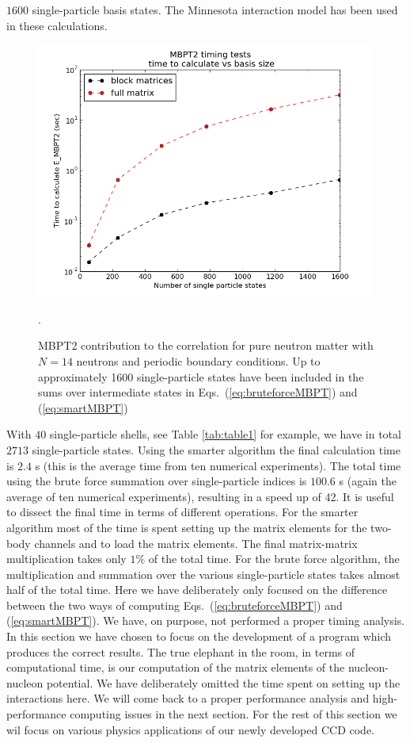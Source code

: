 $1600$ single-particle basis states. The Minnesota interaction model \cite{minnesota} has been used in these calculations.  
\begin{figure}
    \includegraphics[width=\linewidth]{Chapter8-figures/blockvsfull_log.png}
    \caption{MBPT2 contribution to the correlation for pure neutron matter with $N=14$ neutrons and periodic boundary conditions. Up to approximately 1600 single-particle states have been included in the sums over intermediate states in Eqs.~(\ref{eq:bruteforceMBPT}) and (\ref{eq:smartMBPT})}. 
    \label{fig:speedup1}
  \end{figure}
With $40$ single-particle shells, see Table \ref{tab:table1} for
example, we have in total $2713$ single-particle states.  Using the
smarter algorithm the final calculation time is $2.4$ s (this is the
average time from ten numerical experiments).  The total time using
the brute force summation over single-particle indices is $100.6$ s
(again the average of ten numerical experiments), resulting in a speed
up of 42. It is useful to dissect the final time in terms of different
operations.  For the smarter algorithm most of the time is spent
setting up the matrix elements for the two-body channels and to load
the matrix elements. The final matrix-matrix multiplication takes only
$1\%$ of the total time. For the brute force algorithm, the
multiplication and summation over the various single-particle states
takes almost half of the total time. Here we have deliberately only
focused on the difference between the two ways of computing
Eqs.~(\ref{eq:bruteforceMBPT}) and (\ref{eq:smartMBPT}). We have, on
purpose, not performed a proper timing analysis. In this section we
have chosen to focus on the development of a program which produces
the correct results.  The true elephant in the room, in terms of
computational time, is our computation of the matrix elements of the
nucleon-nucleon potential. We have deliberately omitted the time spent on setting up the interactions here.
We will come back to a proper performance
analysis and high-performance computing issues in the next
section. For the rest of this section we wil focus on various physics
applications of our newly developed CCD code.

